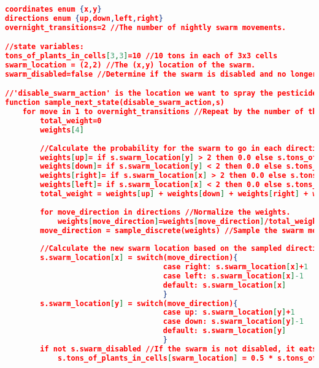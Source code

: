 


\captionsetup[lstlisting]{labelfont=bf,singlelinecheck=off,labelsep=space}{}
\begin{lstlisting}[floatplacement=h,numbersymbol=$:$,language=json,caption={The Locusts Swarm domain in pseudo PPL code.},label={lst:LocustsDomain_PPL},basicstyle=\tiny] 
coordinates enum {x,y}
directions enum {up,down,left,right}
overnight_transitions=2 //The number of nightly swarm movements.

//state variables:
tons_of_plants_in_cells[3,3]=10 //10 tons in each of 3x3 cells
swarm_location = (2,2) //The (x,y) location of the swarm.
swarm_disabled=false //Determine if the swarm is disabled and no longer damages the plants.

//'disable_swarm_action' is the location we want to spray the pesticides. 's' is the state we want to sample from. 
function sample_next_state(disable_swarm_action,s)
    for move in 1 to overnight_transitions //Repeat by the number of the swarm nightly transitions.
        total_weight=0	
        weights[4]
        
        //Calculate the probability for the swarm to go in each direction based on the amounts of plants there. 
        weights[up]= if s.swarm_location[y] > 2 then 0.0 else s.tons_of_plants_in_cells[s.swarm_location[x],s.swarm_location[y]+1]
        weights[down]= if s.swarm_location[y] < 2 then 0.0 else s.tons_of_plants_in_cells[s.swarm_location[x],s.swarm_location[y]-1]
        weights[right]= if s.swarm_location[x] > 2 then 0.0 else s.tons_of_plants_in_cells[s.swarm_location[x]+1],s.swarm_location[y]]
        weights[left]= if s.swarm_location[x] < 2 then 0.0 else s.tons_of_plants_in_cells[s.swarm_location[x]-1],s.swarm_location[y]]
        total_weight = weights[up] + weights[down] + weights[right] + weights[left]
        
        for move_direction in directions //Normalize the weights.
            weights[move_direction]=weights[move_direction]/total_weight
        move_direction = sample_discrete(weights) //Sample the swarm movement direction.
        
        //Calculate the new swarm location based on the sampled direction.
        s.swarm_location[x] = switch(move_direction){
                                    case right: s.swarm_location[x]+1
                                    case left: s.swarm_location[x]-1
                                    default: s.swarm_location[x]
                                    }
        s.swarm_location[y] = switch(move_direction){
                                    case up: s.swarm_location[y]+1
                                    case down: s.swarm_location[y]-1
                                    default: s.swarm_location[y]
                                    }
        if not s.swarm_disabled //If the swarm is not disabled, it eats half the food in its current location.
            s.tons_of_plants_in_cells[swarm_location] = 0.5 * s.tons_of_plants_in_cells[swarm_location]
            

\end{lstlisting}

